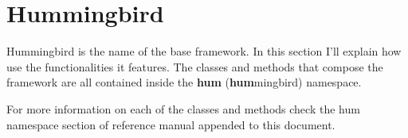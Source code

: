 \section{Hummingbird}

Hummingbird is the name of the base framework. In this section I'll explain how 
use the functionalities it features. The classes and methods that compose the framework 
are all contained inside the \textbf{hum} (\textbf{hum}mingbird) namespace.

For more information on each of the classes and methods check the hum namespace 
section of reference manual appended to this document.














